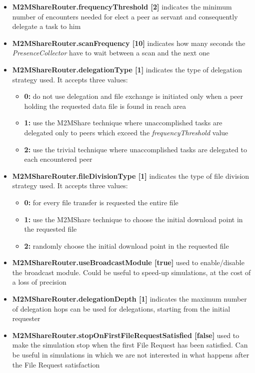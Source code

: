 \begin{itemize}
\item \textbf{M2MShareRouter.frequencyThreshold [2]} indicates the minimum number of encounters needed for elect a peer as servant and consequently delegate a task to him 
\item \textbf{M2MShareRouter.scanFrequency [10]} indicates how many seconds the \textit{PresenceCollector} have to wait between a scan and the next one
\item \textbf{M2MShareRouter.delegationType [1]} indicates the type of delegation strategy used. It accepts three values:
\begin{itemize}
\item \textbf{0:} do not use delegation and file exchange is initiated only when a peer holding the requested data file is found in reach area 
\item \textbf{1:} use the M2MShare technique where unaccomplished tasks are delegated only to peers which exceed the \textit{frequencyThreshold} value
\item \textbf{2:} use the trivial technique where unaccomplished tasks are delegated to each encountered peer
\end{itemize}
\item \textbf{M2MShareRouter.fileDivisionType [1]} indicates the type of file division strategy used. It accepts three values:
\begin{itemize}
\item \textbf{0:} for every file transfer is requested the entire file
\item \textbf{1:} use the M2MShare technique to choose the initial download point in the requested file
\item \textbf{2:} randomly choose the initial download point in the requested file
\end{itemize}
\item \textbf{M2MShareRouter.useBroadcastModule [true]} used to enable/disable the broadcast module. Could be useful to speed-up simulations, at the cost of a loss of precision
\item \textbf{M2MShareRouter.delegationDepth [1]} indicates the maximum number of delegation hops can be used for delegations, starting from the initial requester
\item \textbf{M2MShareRouter.stopOnFirstFileRequestSatisfied [false]} used to make the simulation stop when the first File Request has been satisfied. Can be useful in simulations in which we are not interested in what happens after the File Request satisfaction
\end{itemize}


